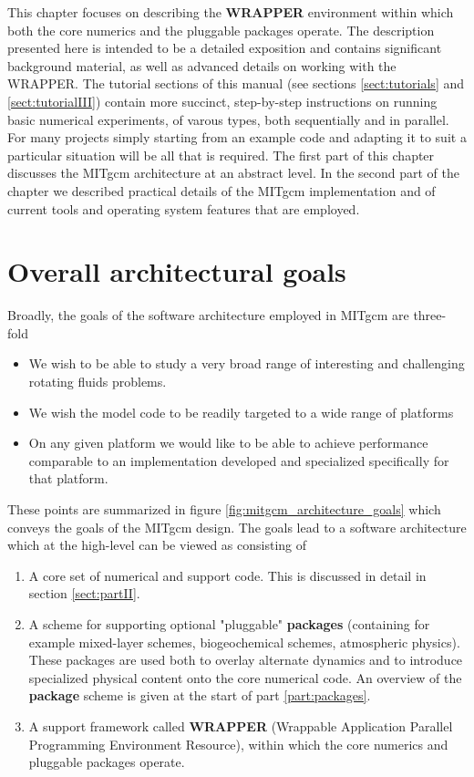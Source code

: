 
This chapter focuses on describing the {\bf WRAPPER} environment within which
both the core numerics and the pluggable packages operate. The description
presented here is intended to be a detailed exposition and contains significant
background material, as well as advanced details on working with the WRAPPER. 
The tutorial sections of this manual (see sections
\ref{sect:tutorials}  and \ref{sect:tutorialIII}) 
contain more succinct, step-by-step instructions on running basic numerical
experiments, of varous types, both sequentially and in parallel. For many 
projects simply starting from an example code and adapting it to suit a 
particular situation 
will be all that is required.
The first part of this chapter discusses the MITgcm architecture at an 
abstract level. In the second part of the chapter we described practical 
details of the MITgcm implementation and of current tools and operating system 
features that are employed.

\section{Overall architectural goals}

Broadly, the goals of the software architecture employed in MITgcm are 
three-fold
 
\begin{itemize}
\item We wish to be able to study a very broad range
of interesting and challenging rotating fluids problems.
\item We wish the model code to be readily targeted to
a wide range of platforms
\item On any given platform we would like to be
able to achieve performance comparable to an implementation 
developed and specialized specifically for that platform.
\end{itemize}

These points are summarized in figure \ref{fig:mitgcm_architecture_goals} 
which conveys the goals of the MITgcm design. The goals lead to
a software architecture which at the high-level can be viewed as consisting 
of

\begin{enumerate}
\item A core set of numerical and support code. This is discussed in detail in
section \ref{sect:partII}.
\item A scheme for supporting optional "pluggable" {\bf packages} (containing 
for example mixed-layer schemes, biogeochemical schemes, atmospheric physics). 
These packages are used both to overlay alternate dynamics and to introduce 
specialized physical content onto the core numerical code. An overview of
the {\bf package} scheme is given at the start of part \ref{part:packages}.
\item A support framework called {\bf WRAPPER} (Wrappable Application Parallel 
Programming Environment Resource), within which the core numerics and pluggable 
packages operate.
\end{enumerate}

